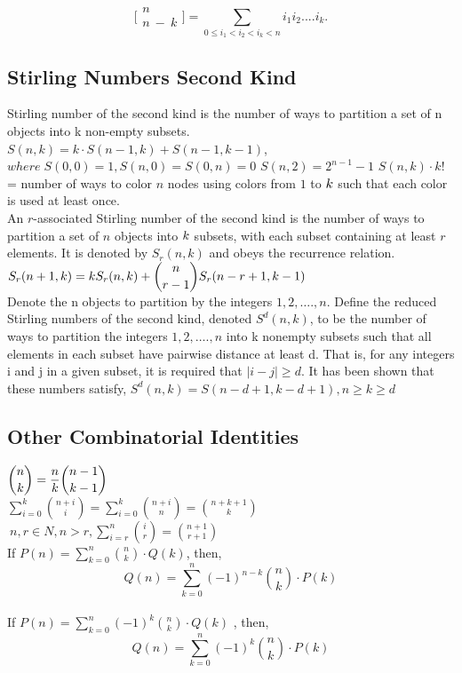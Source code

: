 \begin{multicols*}{2}
\[\displaystyle \bigl[\!\begin{smallmatrix} n \\ n\ -\ k \end{smallmatrix}\!\bigr] = \sum_{0 \leq i_1 < i_2 < i_k < n}{i_1i_2....i_k.}\]

\subsection{Stirling Numbers Second Kind}
Stirling number of the second kind is the number of ways to partition a set of n objects into k non-empty subsets. \\
$S(n,k)=k \cdot S(n-1,k)+S(n-1,k-1)$, \(where \; S(0,0)=1,S(n,0)=S(0,n)=0\)
$S(n,2)=2^{n-1}-1$ 
$S(n,k) \cdot k!$ = number of ways to color $n$ nodes using colors from $\displaystyle 1$ to $\displaystyle \displaystyle k$ such that each color is used at least once. \\
An $r$-associated Stirling number of the second kind is the number of ways to partition a set of $n$ objects into $\displaystyle \displaystyle k$ subsets, with each subset containing at least $r$ elements. It is denoted by $S_r( n , k )$ and obeys the recurrence relation. $\displaystyle \displaystyle S_r(n+1,k) = k S_r(n,k) + \binom{n}{r-1} S_r(n-r+1,k-1)$ \\ 
Denote the n objects to partition by the integers $\displaystyle 1, 2, …., n$. Define the reduced Stirling numbers of the second kind, denoted $S^d(n, k)$, to be the number of ways to partition the integers $\displaystyle 1, 2, …., n$ into k nonempty subsets such that all elements in each subset have pairwise distance at least d. That is, for any integers i and j in a given subset, it is required that $|i - j| \geq d$. It has been shown that these numbers satisfy, \(S^d(n, k) = S(n - d + 1, k - d + 1), n \geq k \geq d\)
\subsection{Other Combinatorial Identities}
$\displaystyle \displaystyle {n \choose k}=\frac{n}{k}{n-1 \choose k-1}$ \\
$\displaystyle \sum \limits_{i= 0}^k{n+i \choose i}= \sum \limits_{i= 0}^k{n+i \choose n} = {n+k+1 \choose k}$ \\
$\displaystyle \ n,r \in N, n > r, \sum \limits_{i=r}^n{i \choose r}={n+1 \choose r+1}$ \\
If $\displaystyle P(n)=\sum_{k=0}^{n}{n \choose k} \cdot Q(k)$, then,
\[Q(n)=\sum_{k=0}^{n}(-1)^{n-k}{n \choose k} \cdot P(k)\] \\
If $\displaystyle P(n)=\sum_{k=0}^{n}(-1)^{k}{n \choose k} \cdot Q(k)$ , then,
\[Q(n)=\sum_{k=0}^{n}(-1)^{k}{n \choose k} \cdot P(k)\]


\end{multicols*}
